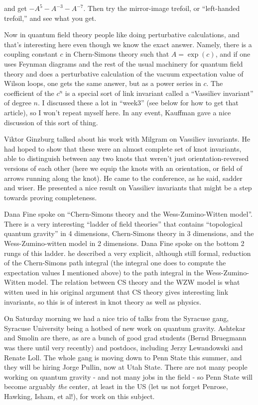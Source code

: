 \documentclass{article}
\begin{document}
and get \(-A^5 - A^{-3} - A^{-7}\). Then try the mirror-image trefoil,
or ``left-handed trefoil,'' and see what you get.

Now in quantum field theory people like doing perturbative calculations,
and that's interesting here even though we know the exact answer.
Namely, there is a coupling constant \(c\) in Chern-Simons theory such
that \(A = \exp(c)\), and if one uses Feynman diagrams and the rest of
the usual machinery for quantum field theory and does a perturbative
calculation of the vacuum expectation value of Wilson loops, one gets
the same answer, but as a power series in \(c\). The coefficient of the
\(c^n\) is a special sort of link invariant called a ``Vassiliev
invariant'' of degree \(n\). I discussed these a lot in ``week3'' (see
below for how to get that article), so I won't repeat myself here. In
any event, Kauffman gave a nice discussion of this sort of thing.

Viktor Ginzburg talked about his work with Milgram on Vassiliev
invariants. He had hoped to show that these were an almost complete set
of knot invariants, able to distinguish between any two knots that
weren't just orientation-reversed versions of each other (here we equip
the knots with an orientation, or field of arrows running along the
knot). He came to the conference, as he said, sadder and wiser. He
presented a nice result on Vassiliev invariants that might be a step
towards proving completeness.

Dana Fine spoke on ``Chern-Simons theory and the Wess-Zumino-Witten
model''. There is a very interesting ``ladder of field theories'' that
contains ``topological quantum gravity'' in 4 dimensions, Chern-Simons
theory in 3 dimensions, and the Wess-Zumino-witten model in 2
dimensions. Dana Fine spoke on the bottom 2 rungs of this ladder. he
described a very explicit, although still formal, reduction of the
Chern-Simons path integral (the integral one does to compute the
expectation values I mentioned above) to the path integral in the
Wess-Zumino-Witten model. The relation between CS theory and the WZW
model is what witten used in his original argument that CS theory gives
interesting link invariants, so this is of interest in knot theory as
well as physics.

On Saturday morning we had a nice trio of talks from the Syracuse gang,
Syracuse University being a hotbed of new work on quantum gravity.
Ashtekar and Smolin are there, as are a bunch of good grad students
(Bernd Bruegmann was there until very recently) and postdocs, including
Jerzy Lewandowski and Renate Loll. The whole gang is moving down to Penn
State this summer, and they will be hiring Jorge Pullin, now at Utah
State. There are not many people working on quantum gravity - and not
many jobs in the field - so Penn State will become arguably \emph{the}
center, at least in the US (let us not forget Penrose, Hawking, Isham,
et al!), for work on this subject.
\end{document}
